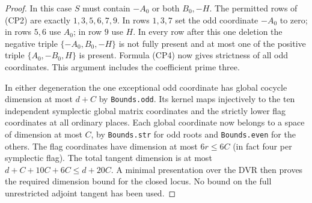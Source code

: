 \begin{proof}
In this case $S$ must contain $-A_0$ or both $B_0,-H$.
The permitted rows of (CP2) are exactly
$1,3,5,6,7,9$. In rows $1,3,7$ set the odd coordinate
$-A_0$ to zero; in rows $5,6$ use $A_0$; in row $9$
use $H$. In every row after this one deletion the
negative triple $\{-A_0,B_0,-H\}$ is not fully present
and at most one of the positive triple
$\{A_0,-B_0,H\}$ is present. Formula (CP4) now gives
strictness of all odd coordinates. This argument
includes the coefficient prime three.

In either degeneration the one exceptional odd
coordinate has global cocycle dimension at most
$d+C$ by \texttt{Bounds.odd}. Its kernel maps
injectively to the ten independent symplectic
global matrix coordinates and the strictly lower
flag coordinates at all ordinary places. Each
global coordinate now belongs to a space of
dimension at most $C$, by \texttt{Bounds.str} for
odd roots and \texttt{Bounds.even} for the others.
The flag coordinates have dimension at most
$6r\leq6C$ (in fact four per symplectic flag).
The total tangent dimension is at most
$d+C+10C+6C\leq d+20C$. A minimal presentation
over the DVR then proves the required dimension
bound for the closed locus. No bound on the full
unrestricted adjoint tangent has been used.
\end{proof}

